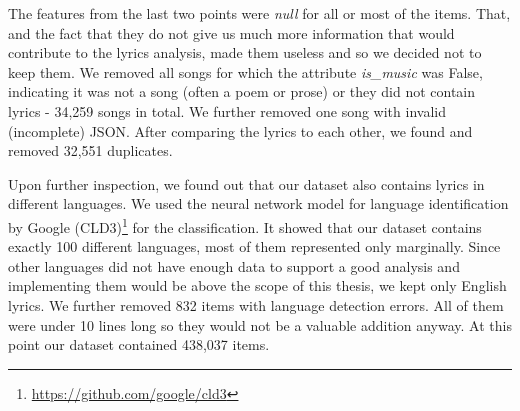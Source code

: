 The features from the last two points were \textit{null} for all or most of the items. That, and the fact that they do not give us much more information that would contribute to the lyrics analysis, made them useless and so we decided not to keep them. We removed all songs for which the attribute \textit{is\_music} was False, indicating it was not a song (often a poem or prose) or they did not contain lyrics - 34,259 songs in total. We further removed one song with invalid (incomplete) JSON. After comparing the lyrics to each other, we found and removed 32,551 duplicates.

Upon further inspection, we found out that our dataset also contains lyrics in different languages. We used the neural network model for language identification by Google (CLD3)\footnote{\url{https://github.com/google/cld3}} for the classification. It showed that our dataset contains exactly 100 different languages, most of them represented only marginally. Since other languages did not have enough data to support a good analysis and implementing them would be above the scope of this thesis, we kept only English lyrics. We further removed 832 items with language detection errors. All of them were under 10 lines long so they would not be a valuable addition anyway. At this point our dataset contained 438,037 items.

